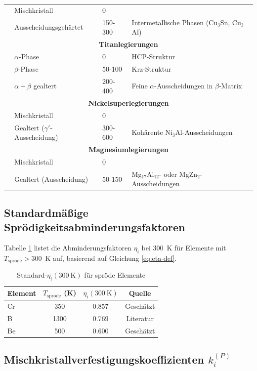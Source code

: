 \documentclass[12pt,a4paper]{article}
\begin{document}
\begin{longtable}{p{3.5cm} p{3.0cm} p{3.0cm} p{4cm}}
		& Mischkristall & 0 & \\
		& Ausscheidungsgehärtet & 150-300 & Intermetallische Phasen (Cu$_3$Sn, Cu$_3$Al) \\
		\hline
		\multicolumn{4}{c}{\textbf{Titanlegierungen}} \\
		& $\alpha$-Phase & 0 & HCP-Struktur \\
		& $\beta$-Phase & 50-100 & Krz-Struktur \\
		& $\alpha+\beta$ gealtert & 200-400 & Feine $\alpha$-Ausscheidungen in $\beta$-Matrix \\
		\hline
		\multicolumn{4}{c}{\textbf{Nickelsuperlegierungen}} \\
		& Mischkristall & 0 & \\
		& Gealtert ($\gamma'$-Ausscheidung) & 300-600 & Kohärente Ni$_3$Al-Ausscheidungen \\
		\hline
		\multicolumn{4}{c}{\textbf{Magnesiumlegierungen}} \\
		& Mischkristall & 0 & \\
		& Gealtert (Ausscheidung) & 50-150 & Mg$_{17}$Al$_{12}$- oder MgZn$_2$-Ausscheidungen \\
		\bottomrule
	\end{longtable}
	
	\subsection{Standardmäßige Sprödigkeitsabminderungsfaktoren}
	\label{subsec:eta-table}
	Tabelle \ref{tab:eta} listet die Abminderungsfaktoren $\eta_i$ bei 300~K für Elemente mit $T_{\text{spröde}} > 300$~K auf, basierend auf Gleichung \ref{eq:eta-def}.
	\begin{table}[htbp]
		\centering
		\caption{Standard-$\eta_i(300\ \mathrm{K})$ für spröde Elemente}
		\label{tab:eta}
		\begin{tabular}{lccc}
			\toprule
			\textbf{Element} & $T_{\text{spröde}}$ (K) & $\eta_i(300\ \mathrm{K})$ & \textbf{Quelle} \\
			\midrule
			Cr & 350 & 0.857 & Geschätzt \\
			B  & 1300 & 0.769 & Literatur \\
			Be & 500 & 0.600 & Geschätzt \\
			\bottomrule
		\end{tabular}
	\end{table}
	
	\subsection{Mischkristallverfestigungskoeffizienten $k_i^{(P)}$}
	\label{subsec:kss}
	
\end{document}
